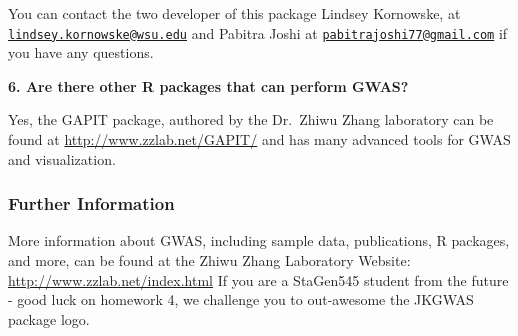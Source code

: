 \documentclass[
]{article}
\begin{document}
You can contact the two developer of this package Lindsey Kornowske, at
\href{mailto:lindsey.kornowske@wsu.edu}{\nolinkurl{lindsey.kornowske@wsu.edu}}
and Pabitra Joshi at
\href{mailto:pabitrajoshi77@gmail.com}{\nolinkurl{pabitrajoshi77@gmail.com}}
if you have any questions.

\par

\textbf{6. Are there other R packages that can perform GWAS?}

\par

Yes, the GAPIT package, authored by the Dr.~Zhiwu Zhang laboratory can
be found at \url{http://www.zzlab.net/GAPIT/} and has many advanced
tools for GWAS and visualization.

\par

\hypertarget{further-information}{%
\subsubsection{\texorpdfstring{\textbf{Further
Information}}{Further Information}}\label{further-information}}

More information about GWAS, including sample data, publications, R
packages, and more, can be found at the Zhiwu Zhang Laboratory Website:
\url{http://www.zzlab.net/index.html} If you are a StaGen545 student
from the future - good luck on homework 4, we challenge you to
out-awesome the JKGWAS package logo.
\end{document}

